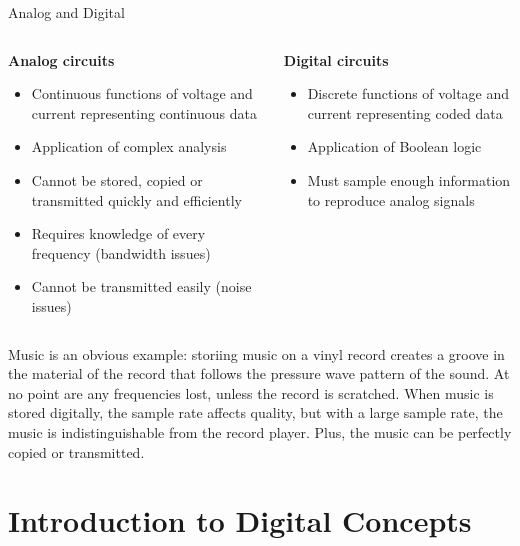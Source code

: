 \documentclass{beamer}
\begin{document}
\begin{frame}{Analog and Digital}
\tiny
\begin{columns}[T]
\begin{column}{0.5\textwidth}
\centering
\textbf{Analog circuits}
\begin{itemize}
\item Continuous functions of voltage and current representing continuous data
\item Application of complex analysis
\end{itemize}
\hrulefill
\begin{itemize}
\item Cannot be stored, copied or transmitted quickly and efficiently
\item Requires knowledge of every frequency (bandwidth issues)
\item Cannot be transmitted easily (noise issues)
\end{itemize}
\end{column}
\begin{column}{0.5\textwidth}
\centering
\textbf{Digital circuits}
\begin{itemize}
\item Discrete functions of voltage and current representing coded data
\item Application of Boolean logic
\end{itemize}
\hrulefill
\begin{itemize}
\item Must sample enough information to reproduce analog signals
\end{itemize}
\end{column}
\end{columns}
Music is an obvious example: storiing music on a vinyl record creates a groove in the material of the record that follows the pressure wave pattern of the sound.  At no point are any frequencies lost, unless the record is scratched.  When music is stored digitally, the sample rate affects quality, but with a large sample rate, the music is indistinguishable from the record player.  Plus, the music can be perfectly copied or transmitted.
\end{frame}

\section{Introduction to Digital Concepts}
\end{document}
